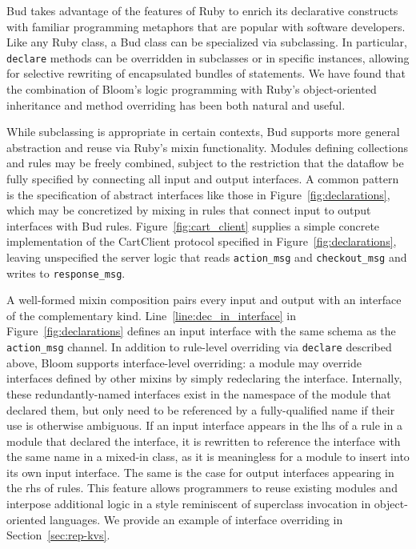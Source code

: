 \begin{comment}
Conventional wisdom in certain quarters says that rule-based languages are
untenable for large programs that evolve over time, since the interactions among
rules become too difficult to understand.  We believe this concern is an
artifact of early rule languages that mixed apparently declarative syntax with
imperative constructs and assumptions, and which had little support for
modularity and reuse of code.
\end{comment}

Bud takes advantage of the features of Ruby to enrich its declarative constructs
with familiar programming metaphors that are popular with software developers.
Like any Ruby class, a Bud class can be specialized via subclassing.  In
particular, \texttt{declare} methods can be overridden in subclasses or in
specific instances, allowing for selective rewriting of encapsulated bundles of
statements.  We have found that the combination of Bloom's logic programming
with Ruby's object-oriented inheritance and method overriding has been both
natural and useful.

While subclassing is appropriate in certain contexts, Bud supports more general
abstraction and reuse via Ruby's mixin functionality.  Modules defining
collections and rules may be freely combined, subject to the restriction that
the dataflow be fully specified by connecting all input and output interfaces.
A common pattern is the specification of abstract interfaces like those in
Figure~\ref{fig:declarations}, which may be concretized by mixing in rules that
connect input to output interfaces with Bud rules.  Figure~\ref{fig:cart_client}
supplies a simple concrete implementation of the CartClient protocol specified
in Figure~\ref{fig:declarations}, leaving unspecified the server logic that
reads \texttt{action\_msg} and \texttt{checkout\_msg} and writes to
\texttt{response\_msg}.

A well-formed mixin composition pairs every input and output with an interface
of the complementary kind.  Line~\ref{line:dec_in_interface} in
Figure~\ref{fig:declarations} defines an input interface with the same schema as
the \texttt{action\_msg} channel.  In addition to rule-level overriding via
\texttt{declare} described above, Bloom supports interface-level overriding: a
module may override interfaces defined by other mixins by simply redeclaring the
interface.  Internally, these redundantly-named interfaces exist in the
namespace of the module that declared them, but only need to be referenced by a
fully-qualified name if their use is otherwise ambiguous.  If an input interface
appears in the lhs of a rule in a module that declared the interface, it is
rewritten to reference the interface with the same name in a mixed-in class, as
it is meaningless for a module to insert into its own input interface.  The same
is the case for output interfaces appearing in the rhs of rules.  This feature
allows programmers to reuse existing modules and interpose additional logic in a
style reminiscent of superclass invocation in object-oriented languages.  We
provide an example of interface overriding in Section~\ref{sec:rep-kvs}.

